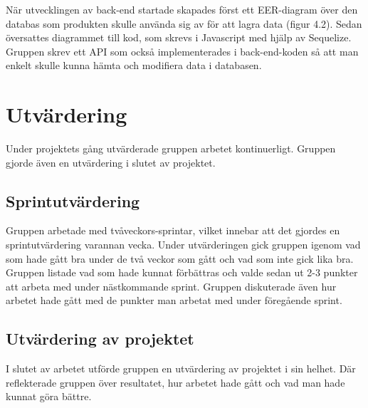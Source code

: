 När utvecklingen av back-end startade skapades först ett EER-diagram över den databas som produkten skulle använda sig av för att lagra data (figur 4.2). 
Sedan översattes diagrammet till kod, som skrevs i Javascript med hjälp av Sequelize. 
Gruppen skrev ett API som också implementerades i back-end-koden så att man enkelt skulle kunna hämta och modifiera data i databasen.

\section{Utvärdering}
Under projektets gång utvärderade gruppen arbetet kontinuerligt. Gruppen gjorde även en utvärdering i slutet av projektet.

\subsection{Sprintutvärdering}
Gruppen arbetade med tvåveckors-sprintar, vilket innebar att det gjordes en sprintutvärdering varannan vecka. Under utvärderingen gick gruppen igenom vad som hade gått bra under de två veckor som gått och vad som inte gick lika bra. Gruppen listade vad som hade kunnat förbättras och valde sedan ut 2-3 punkter att arbeta med under nästkommande sprint. Gruppen diskuterade även hur arbetet hade gått med de punkter man arbetat med under föregående sprint.

\subsection{Utvärdering av projektet}
I slutet av arbetet utförde gruppen en utvärdering av projektet i sin helhet. Där reflekterade gruppen över resultatet, hur arbetet hade gått och vad man hade kunnat göra bättre.
